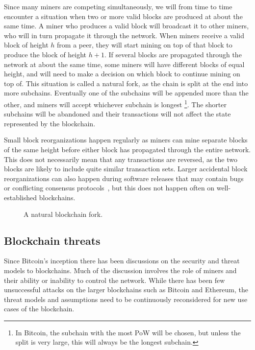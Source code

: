 Since many miners are competing simultaneously, we will from time to time encounter a situation when two or more valid blocks are produced at about the same time. A miner who produces a valid block will broadcast it to other miners, who will in turn propagate it through the network. When miners receive a valid block of height $h$ from a peer, they will start mining on top of that block to produce the block of height $h+1$. If several blocks are propagated through the network at about the same time, some miners will have different blocks of equal height, and will need to make a decision on which block to continue mining on top of. This situation is called a natural fork, as the chain is split at the end into more subchains. Eventually one of the subchains will be appended more than the other, and miners will accept whichever subchain is longest \footnote{In Bitcoin, the subchain with the most PoW will be chosen, but unless the split is very large, this will always be the longest subchain.}. The shorter subchains will be abandoned and their transactions will not affect the state represented by the blockchain.

Small block reorganizations happen regularly as miners can mine separate blocks of the same height before either block has propagated through the entire network. This does not necessarily mean that any transactions are reversed, as the two blocks are likely to include quite similar transaction sets. Larger accidental block reorganizations can also happen during software releases that may contain bugs or conflicting consensus protocols~\cite{andresen_march_2013}, but this does not happen often on well-established blockchains.

\begin{figure}[htbp]
  \centering
  
  \caption{A natural blockchain fork.}
  \label{fig:blockchain-fork}
\end{figure}


\subsection{Blockchain threats}

Since Bitcoin's inception there has been discussions on the security and threat models to blockchains. Much of the discussion involves the role of miners and their ability or inability to control the network. While there has been few unsuccessful attacks on the larger blockchains such as Bitcoin and Ethereum, the threat models and assumptions need to be continuously reconsidered for new use cases of the blockchain.

